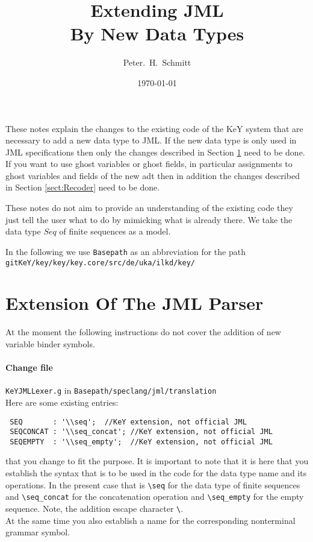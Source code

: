 \documentclass[11pt]{article}
\title{Extending JML\\By New Data Types}
\date{\today}
\author{Peter.~H.~Schmitt}
\begin{document}
\maketitle

These notes explain the changes to the existing code of the KeY system that are necessary to add a new data type to JML.
If the new data type is only used in JML specifications then only the changes described in Section
\ref{sect:JML} need to be done. 
If you want to use ghost variables or ghost fields, in particular assignments to ghost variables and fields 
of the new adt then in addition the changes  described in Section
\ref{sect:Recoder} need to be done. 

These notes do not aim to provide an understanding of the existing code they just tell the user what to do by mimicking
what is already there. We take the data type $Seq$ of finite sequences as a model.

In the following we use \verb+Basepath+ as an abbreviation for the path\\[5pt]
\verb+gitKeY/key/key/key.core/src/de/uka/ilkd/key/+

\section{Extension Of  The JML Parser}
\label{sect:JML}

At the moment the following instructions do not cover the addition of new variable binder symbols.

\paragraph{Change file} \verb+KeYJMLLexer.g+ in \verb+Basepath/speclang/jml/translation+\\
Here are some existing entries:
\begin{verbatim}
 SEQ       : '\\seq';  //KeY extension, not official JML
 SEQCONCAT : '\\seq_concat'; //KeY extension, not official JML
 SEQEMPTY  : '\\seq_empty';  //KeY extension, not official JML
\end{verbatim}
that you change to fit the purpose. It is important to note that it is here that you establish
the syntax that is to be used in the code for the data type name and its operations. In the present case that is 
\verb+\seq+ for the data type of finite sequences and \verb+\seq_concat+ for the concatenation operation and
  \verb+\seq_empty+ for the empty sequence. Note, the addition escape character \verb+\+.\\
At the same time you also establish a name for the corresponding nonterminal grammar symbol. 
\end{document}

